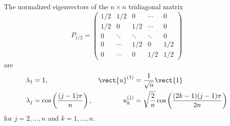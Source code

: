 \documentclass[12pt]{article}
\begin{document}
\begin{lemma}
    \label{fastestmixing:lemma:threepointfive} The normalized
    eigenvectors of the \( n \times n \) tridiagonal matrix
    \[
        P_{1/2} =
        \begin{pmatrix}
            1/2 & 1/2 & 0 & \cdots & 0 \\
            1/2 & 0 & 1/2 & \cdots & 0 \\
            0 & \ddots & \ddots & \ddots& 0 \\
            0 & \cdots & 1/2 & 0 & 1/2 \\
            0 & \cdots & 0 & 1/2 & 1/2
        \end{pmatrix}
    \] are
    \begin{align*}
        \lambda_1 &= 1, & \vect{u}^{(1)} &= \frac{1}{\sqrt{n}}\vect{1}
        \\
        \lambda_j &= \cos\left( \frac{(j-1) \pi}{n} \right), & u^{(j)}_k
        &= \sqrt{\frac{2}{n}} \cos\left( \frac{(2k-1)(j-1)\pi}{2n}
        \right)
    \end{align*}
    for \( j=2, \dots, n \) and \( k=1,\dots, n \).
\end{lemma}
\end{document}
